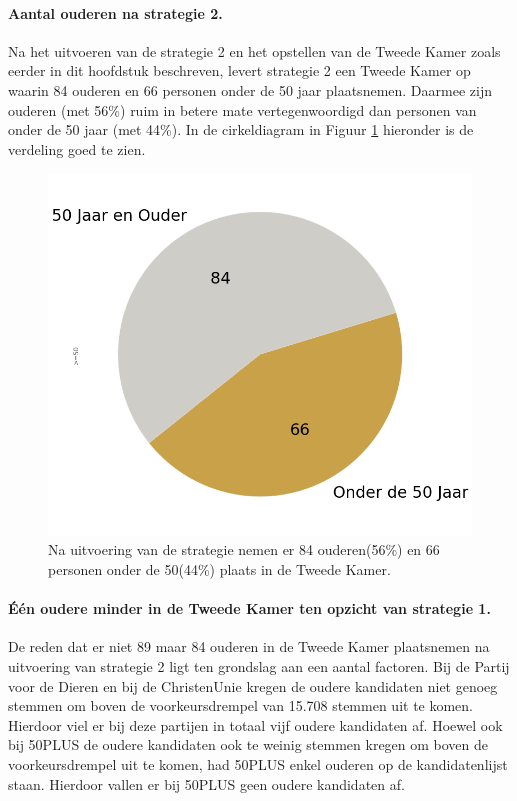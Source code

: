 \paragraph{Aantal ouderen na strategie 2.}
Na het uitvoeren van de strategie 2 en het opstellen van de Tweede Kamer zoals eerder in dit hoofdstuk beschreven, levert strategie 2 een Tweede Kamer op waarin 84 ouderen  en 66 personen onder de 50 jaar  plaatsnemen. Daarmee zijn ouderen (met 56\%) ruim in betere mate vertegenwoordigd dan personen van onder de 50 jaar (met 44\%). In de cirkeldiagram in Figuur \ref{fig:pcS2O} hieronder is de verdeling goed te zien. 


\begin{figure}[H]
\centering
	\includegraphics[width=0.42\linewidth]{pie_chart_willekeurig_ouderen.png}

			\caption{Na uitvoering van de strategie nemen er 84 ouderen(56\%) en 66 personen onder de 50(44\%) plaats in de Tweede Kamer.}

\label{fig:pcS2O}
\end{figure}





\paragraph{Één oudere minder in de Tweede Kamer ten opzicht van strategie 1.}
De reden dat er niet 89 maar 84 ouderen in de Tweede Kamer plaatsnemen na uitvoering van strategie 2 ligt ten grondslag aan een aantal factoren. Bij de Partij voor de Dieren en bij de ChristenUnie kregen de oudere kandidaten niet genoeg stemmen om boven de voorkeursdrempel van 15.708 stemmen uit te komen. Hierdoor viel er bij deze partijen in totaal vijf oudere kandidaten af. Hoewel ook bij 50PLUS de oudere kandidaten ook te weinig stemmen kregen om boven de voorkeursdrempel uit te komen, had 50PLUS enkel ouderen op de kandidatenlijst staan. Hierdoor vallen er bij 50PLUS geen oudere kandidaten af. 




